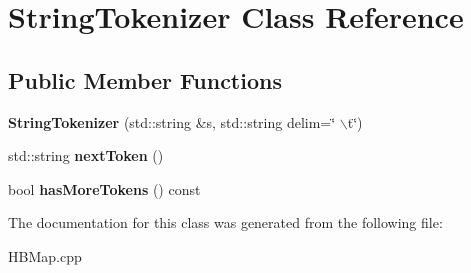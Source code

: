 \hypertarget{class_string_tokenizer}{\section{String\-Tokenizer Class Reference}
\label{class_string_tokenizer}
}
\subsection*{Public Member Functions}
\begin{DoxyCompactItemize}
\item 
\hypertarget{class_string_tokenizer_abe20997216d6c427b1c70ea92ffc58d1}{{\bfseries String\-Tokenizer} (std\-::string \&s, std\-::string delim=\char`\"{} $\backslash$t\char`\"{})}\label{class_string_tokenizer_abe20997216d6c427b1c70ea92ffc58d1}

\item 
\hypertarget{class_string_tokenizer_a3604c402ac9789b32f6446efadf348e0}{std\-::string {\bfseries next\-Token} ()}\label{class_string_tokenizer_a3604c402ac9789b32f6446efadf348e0}

\item 
\hypertarget{class_string_tokenizer_aae2b0616e31bf6342f3417677f2a2c83}{bool {\bfseries has\-More\-Tokens} () const }\label{class_string_tokenizer_aae2b0616e31bf6342f3417677f2a2c83}

\end{DoxyCompactItemize}


The documentation for this class was generated from the following file\-:\begin{DoxyCompactItemize}
\item 
H\-B\-Map.\-cpp\end{DoxyCompactItemize}
